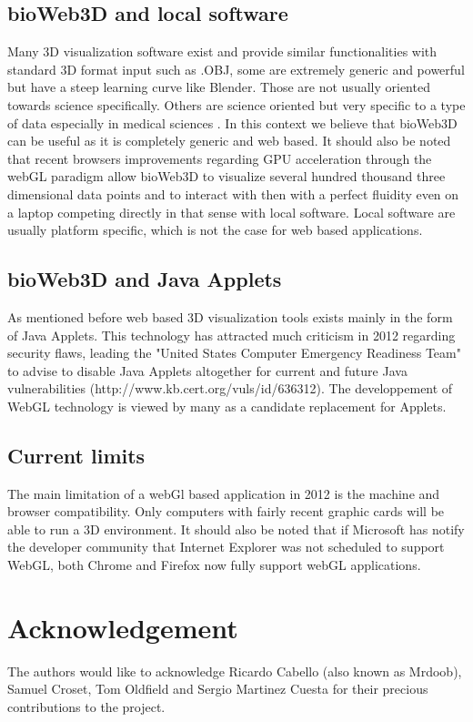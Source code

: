 \documentclass{bioinfo}
\begin{document}
	\subsection{bioWeb3D and local software}
Many 3D visualization software exist and provide similar functionalities with standard 3D format input such as .OBJ, some are extremely generic and powerful but have a steep learning curve like Blender. Those are not usually oriented towards science specifically. Others are science oriented but very specific to a type of data especially in medical sciences \citep{Wang09}. In this context we believe that bioWeb3D can be useful as it is completely generic and web based. It should also be noted that recent browsers improvements regarding GPU acceleration through the webGL paradigm allow bioWeb3D to visualize several hundred thousand three dimensional data points and to interact with then with a perfect fluidity even on a laptop competing directly in that sense with local software. Local software are usually platform specific, which is not the case for web based applications.

	\subsection{bioWeb3D and Java Applets}
As mentioned before web based 3D visualization tools exists mainly in the form of Java Applets. This technology has attracted much criticism in 2012 regarding security flaws, leading the "United States Computer Emergency Readiness Team" to advise to disable Java Applets altogether for current and future Java vulnerabilities (http://www.kb.cert.org/vuls/id/636312). The developpement of WebGL technology is viewed by many as a candidate replacement for Applets. 

	\subsection{Current limits}
The main limitation of a webGl based application in 2012 is the machine and browser compatibility. Only computers with fairly recent graphic cards will be able to run a 3D environment. It should also be noted that if Microsoft has notify the developer community that Internet Explorer was not scheduled to support WebGL, both Chrome and Firefox now fully support webGL applications.



\section*{Acknowledgement}
The authors would like to acknowledge Ricardo Cabello (also known as Mrdoob), Samuel Croset, Tom Oldfield and Sergio Martinez Cuesta for their precious contributions to the project.
\end{document}
